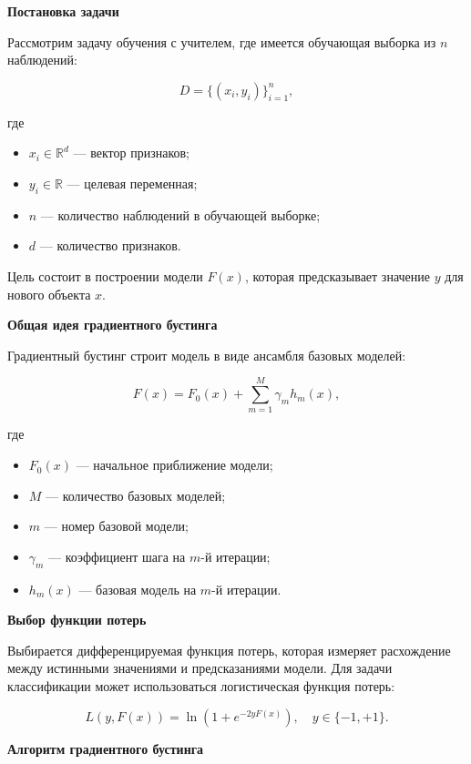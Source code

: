 \textbf{Постановка задачи}

Рассмотрим задачу обучения с учителем, где имеется обучающая выборка из $n$ наблюдений:

\begin{equation}
  D = \{(x_i, y_i)\}_{i=1}^{n},
\end{equation}

где
\begin{itemize}
  \item $x_i \in \mathbb{R}^{d}$ --- вектор признаков;
  \item $y_i \in \mathbb{R}$ --- целевая переменная;
  \item $n$ --- количество наблюдений в обучающей выборке;
  \item $d$ --- количество признаков.
\end{itemize}

Цель состоит в построении модели $F(x)$, которая предсказывает значение $y$ для нового объекта $x$.

\textbf{Общая идея градиентного бустинга}

Градиентный бустинг строит модель в виде ансамбля базовых моделей:

\begin{equation}
  F(x) = F_0(x) + \sum_{m=1}^{M} \gamma_m h_m(x),
\end{equation}

где
\begin{itemize}
  \item $F_0(x)$ --- начальное приближение модели;
  \item $M$ --- количество базовых моделей;
  \item $m$ --- номер базовой модели;
  \item $\gamma_m$ --- коэффициент шага на $m$-й итерации;
  \item $h_m(x)$ --- базовая модель на $m$-й итерации.
\end{itemize}

\textbf{Выбор функции потерь}


Выбирается дифференцируемая функция потерь, которая измеряет расхождение между истинными значениями и предсказаниями модели. Для задачи классификации может использоваться логистическая функция потерь:

\begin{equation}
  L(y, F(x)) = \ln\left(1 + e^{-2yF(x)}\right), \quad y \in \{-1, +1\}.
\end{equation}


\textbf{Алгоритм градиентного бустинга}

